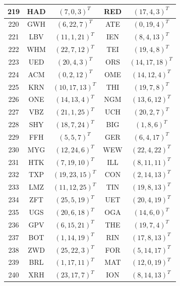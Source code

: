 \begin{longtable}{|c|c|c|c|c|}
  \hline
  219 & HAD & $(7, 0, 3)^T$ & RED & $(17, 4, 3)^T$ \\
  \hline
  220 & GWH & $(6, 22, 7)^T$ & ATE & $(0, 19, 4)^T$ \\
  \hline
  221 & LBV & $(11, 1, 21)^T$ & IEN & $(8, 4, 13)^T$ \\
  \hline
  222 & WHM & $(22, 7, 12)^T$ & TEI & $(19, 4, 8)^T$ \\
  \hline
  223 & UED & $(20, 4, 3)^T$ & ORS & $(14, 17, 18)^T$ \\
  \hline
  224 & ACM & $(0, 2, 12)^T$ & OME & $(14, 12, 4)^T$ \\
  \hline
  225 & KRN & $(10, 17, 13)^T$ & THI & $(19, 7, 8)^T$ \\
  \hline
  226 & ONE & $(14, 13, 4)^T$ & NGM & $(13, 6, 12)^T$ \\
  \hline
  227 & VBZ & $(21, 1, 25)^T$ & UCH & $(20, 2, 7)^T$ \\
  \hline
  228 & SHY & $(18, 7, 24)^T$ & BIG & $(1, 8, 6)^T$ \\
  \hline
  229 & FFH & $(5, 5, 7)^T$ & GER & $(6, 4, 17)^T$ \\
  \hline
  230 & MYG & $(12, 24, 6)^T$ & WEW & $(22, 4, 22)^T$ \\
  \hline
  231 & HTK & $(7, 19, 10)^T$ & ILL & $(8, 11, 11)^T$ \\
  \hline
  232 & TXP & $(19, 23, 15)^T$ & CON & $(2, 14, 13)^T$ \\
  \hline
  233 & LMZ & $(11, 12, 25)^T$ & TIN & $(19, 8, 13)^T$ \\
  \hline
  234 & ZFT & $(25, 5, 19)^T$ & UET & $(20, 4, 19)^T$ \\
  \hline
  235 & UGS & $(20, 6, 18)^T$ & OGA & $(14, 6, 0)^T$ \\
  \hline
  236 & GPV & $(6, 15, 21)^T$ & THE & $(19, 7, 4)^T$ \\
  \hline
  237 & BOT & $(1, 14, 19)^T$ & RIN & $(17, 8, 13)^T$ \\
  \hline
  238 & ZWD & $(25, 22, 3)^T$ & FOR & $(5, 14, 17)^T$ \\
  \hline
  239 & BRL & $(1, 17, 11)^T$ & MAT & $(12, 0, 19)^T$ \\
  \hline
  240 & XRH & $(23, 17, 7)^T$ & ION & $(8, 14, 13)^T$ \\
  \hline
\end{longtable}
